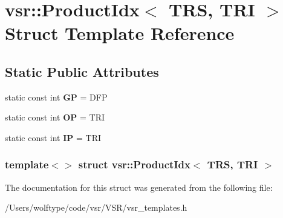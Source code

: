 \hypertarget{structvsr_1_1_product_idx_3_01_t_r_s_00_01_t_r_i_01_4}{\section{vsr\-:\-:Product\-Idx$<$ T\-R\-S, T\-R\-I $>$ Struct Template Reference}
\label{structvsr_1_1_product_idx_3_01_t_r_s_00_01_t_r_i_01_4}
}
\subsection*{Static Public Attributes}
\begin{DoxyCompactItemize}
\item 
\hypertarget{structvsr_1_1_product_idx_3_01_t_r_s_00_01_t_r_i_01_4_a9d1e99c1aa4f8ca507bae7783799618e}{static const int {\bfseries G\-P} = D\-F\-P}\label{structvsr_1_1_product_idx_3_01_t_r_s_00_01_t_r_i_01_4_a9d1e99c1aa4f8ca507bae7783799618e}

\item 
\hypertarget{structvsr_1_1_product_idx_3_01_t_r_s_00_01_t_r_i_01_4_a7ce3760a48b361cc80182ded455d6e3d}{static const int {\bfseries O\-P} = T\-R\-I}\label{structvsr_1_1_product_idx_3_01_t_r_s_00_01_t_r_i_01_4_a7ce3760a48b361cc80182ded455d6e3d}

\item 
\hypertarget{structvsr_1_1_product_idx_3_01_t_r_s_00_01_t_r_i_01_4_ae54d28902d36e854aa3871080e21c9c8}{static const int {\bfseries I\-P} = T\-R\-I}\label{structvsr_1_1_product_idx_3_01_t_r_s_00_01_t_r_i_01_4_ae54d28902d36e854aa3871080e21c9c8}

\end{DoxyCompactItemize}
\subsubsection*{template$<$$>$ struct vsr\-::\-Product\-Idx$<$ T\-R\-S, T\-R\-I $>$}



The documentation for this struct was generated from the following file\-:\begin{DoxyCompactItemize}
\item 
/\-Users/wolftype/code/vsr/\-V\-S\-R/vsr\-\_\-templates.\-h\end{DoxyCompactItemize}
